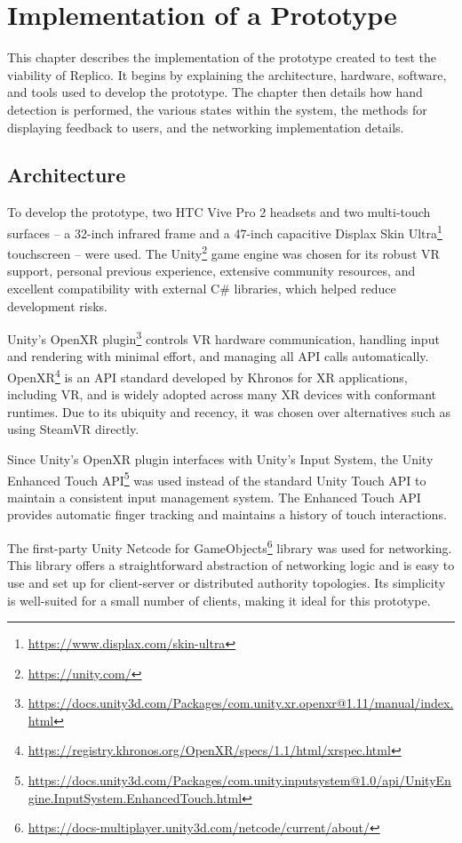 \chapter{Implementation of a Prototype}\label{chap:prototype}

This chapter describes the implementation of the prototype created to test the viability of Replico. It begins by explaining the architecture, hardware, software, and tools used to develop the prototype. The chapter then details how hand detection is performed, the various states within the system, the methods for displaying feedback to users, and the networking implementation details.

\section{Architecture}
    
    To develop the prototype, two HTC Vive Pro 2 headsets and two multi-touch surfaces -- a 32-inch infrared frame and a 47-inch capacitive Displax Skin Ultra\footnote{\url{https://www.displax.com/skin-ultra} } touchscreen -- were used. The Unity\footnote{\url{https://unity.com/}} game engine was chosen for its robust VR support, personal previous experience, extensive community resources, and excellent compatibility with external C\# libraries, which helped reduce development risks.
    
    Unity's OpenXR plugin\footnote{\url{https://docs.unity3d.com/Packages/com.unity.xr.openxr@1.11/manual/index.html}} controls VR hardware communication, handling input and rendering with minimal effort, and managing all API calls automatically. OpenXR\footnote{\url{https://registry.khronos.org/OpenXR/specs/1.1/html/xrspec.html}} is an API standard developed by Khronos for XR applications, including VR, and is widely adopted across many XR devices with conformant runtimes. Due to its ubiquity and recency, it was chosen over alternatives such as using SteamVR directly.

    Since Unity's OpenXR plugin interfaces with Unity's Input System, the Unity Enhanced Touch API\footnote{\url{https://docs.unity3d.com/Packages/com.unity.inputsystem@1.0/api/UnityEngine.InputSystem.EnhancedTouch.html}} was used instead of the standard Unity Touch API to maintain a consistent input management system. The Enhanced Touch API provides automatic finger tracking and maintains a history of touch interactions.

    The first-party Unity Netcode for GameObjects\footnote{\url{https://docs-multiplayer.unity3d.com/netcode/current/about/}} library was used for networking. This library offers a straightforward abstraction of networking logic and is easy to use and set up for client-server or distributed authority topologies. Its simplicity is well-suited for a small number of clients, making it ideal for this prototype.


